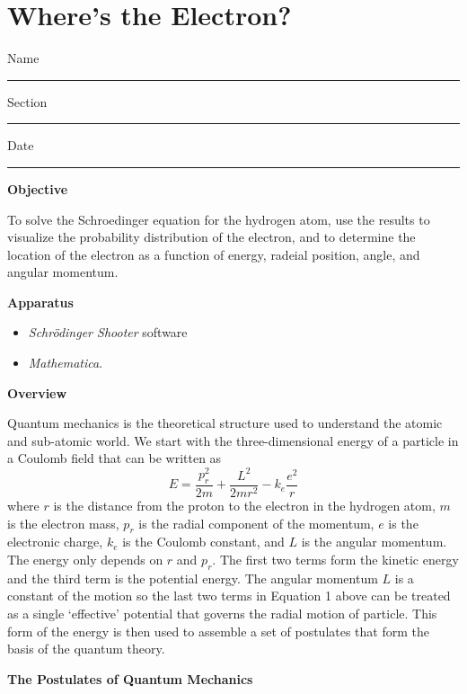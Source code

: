 \setcounter{equation}{0}
\setcounter{figure}{0}

\section{Where's the Electron?}

Name \rule{2.0in}{0.1pt}\hfill{}Section \rule{1.0in}{0.1pt}\hfill{}Date
\rule{1.0in}{0.1pt}

\textbf{Objective}

To solve the Schroedinger equation for the hydrogen atom,
use the results to visualize the probability distribution of the electron, and to
determine the location of the electron as a function of energy, radeial position, angle, 
and angular momentum.

\textbf{Apparatus}

\begin{itemize}

\item {\it Schr\"odinger Shooter} software

\item {\it Mathematica}.

\end{itemize}

\textbf{Overview}

Quantum mechanics is the theoretical structure used to understand the atomic and sub-atomic
world. 
We start with the three-dimensional
energy of a particle in a Coulomb field that can be written as
\begin{equation}
E = \frac{p_r^2}{2m} + \frac{L^2}{2mr^2} - k_e\frac{e^2}{r}
\end{equation}\label{eq:probdens1}
\noindent where $r$ is the distance from the proton to the electron in the hydrogen atom,
$m$ is the electron mass, $p_r$ is the radial component of the momentum, 
$e$ is the electronic charge, $k_e$ is the Coulomb constant, and
$L$ is the angular momentum.
The energy only depends on $r$ and $p_r$.
The first two terms form the kinetic energy and the third term is the potential energy.
The angular momentum $L$ is a constant of the motion so the last two terms in 
Equation 1 above can be treated as a single `effective' potential 
that governs the radial motion of particle.
This form of the energy is then used to assemble a set of postulates that form
the basis of the quantum theory.

\begin{center}
{\bf The Postulates of Quantum Mechanics}
\end{center}

